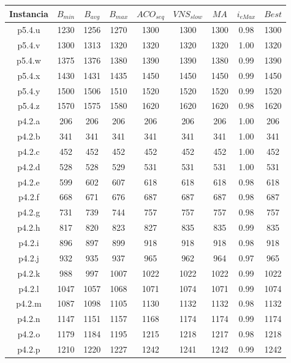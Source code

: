 \begin{table}
\begin{center}
\begin{tabular}{ |c|c|c|c|c|c|c|c|c| } 
\hline
Instancia & $B_{min}$ & $B_{avg}$ & $B_{max}$ & $ACO_{seq}$ & $VNS_{slow}$ & $MA$ & $i_{eMax}$ & $Best$ \\
\hline
p5.4.u & 1230 & 1256 & 1270 & 1300 & 1300 & 1300 & 0.98 & 1300 \\
p5.4.v & 1300 & 1313 & 1320 & 1320 & 1320 & 1320 & 1.00 & 1320 \\
p5.4.w & 1375 & 1376 & 1380 & 1390 & 1390 & 1380 & 0.99 & 1390 \\
p5.4.x & 1430 & 1431 & 1435 & 1450 & 1450 & 1450 & 0.99 & 1450 \\
p5.4.y & 1500 & 1506 & 1510 & 1520 & 1520 & 1520 & 0.99 & 1520 \\
p5.4.z & 1570 & 1575 & 1580 & 1620 & 1620 & 1620 & 0.98 & 1620 \\
p4.2.a & 206 & 206 & 206 & 206 & 206 & 206 & 1.00 & 206 \\
p4.2.b & 341 & 341 & 341 & 341 & 341 & 341 & 1.00 & 341 \\
p4.2.c & 452 & 452 & 452 & 452 & 452 & 452 & 1.00 & 452 \\
p4.2.d & 528 & 528 & 529 & 531 & 531 & 531 & 1.00 & 531 \\
p4.2.e & 599 & 602 & 607 & 618 & 618 & 618 & 0.98 & 618 \\
p4.2.f & 668 & 671 & 676 & 687 & 687 & 687 & 0.98 & 687 \\
p4.2.g & 731 & 739 & 744 & 757 & 757 & 757 & 0.98 & 757 \\
p4.2.h & 817 & 820 & 823 & 827 & 835 & 835 & 0.99 & 835 \\
p4.2.i & 896 & 897 & 899 & 918 & 918 & 918 & 0.98 & 918 \\
p4.2.j & 932 & 935 & 937 & 965 & 962 & 964 & 0.97 & 965 \\
p4.2.k & 988 & 997 & 1007 & 1022 & 1022 & 1022 & 0.99 & 1022 \\
p4.2.l & 1047 & 1057 & 1068 & 1071 & 1074 & 1071 & 0.99 & 1074 \\
p4.2.m & 1087 & 1098 & 1105 & 1130 & 1132 & 1132 & 0.98 & 1132 \\
p4.2.n & 1147 & 1151 & 1157 & 1168 & 1174 & 1174 & 0.99 & 1174 \\
p4.2.o & 1179 & 1184 & 1195 & 1215 & 1218 & 1217 & 0.98 & 1218 \\
p4.2.p & 1210 & 1220 & 1227 & 1242 & 1241 & 1242 & 0.99 & 1242 \\

\end{tabular}
\end{center}
\end{table}
